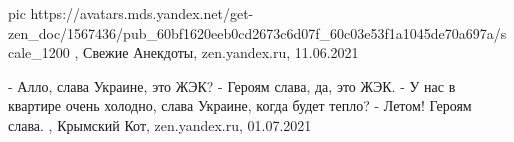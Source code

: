  
 
 
 
 

\ifcmt
  pic https://avatars.mds.yandex.net/get-zen_doc/1567436/pub_60bf1620eeb0cd2673c6d07f_60c03e53f1a1045de70a697a/scale_1200
\fi
{}, Свежие Анекдоты, zen.yandex.ru, 11.06.2021


\obeycr
	- Алло, слава Украине, это ЖЭК?
	- Героям слава, да, это ЖЭК.
	- У нас в квартире очень холодно, слава Украине, когда будет тепло?
	- Летом! Героям слава.
\restorecr
, 
Крымский Кот, zen.yandex.ru, 01.07.2021
